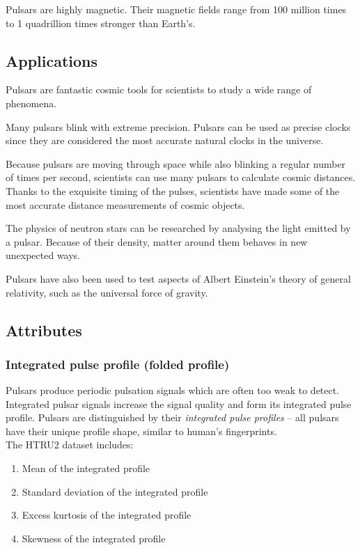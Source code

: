 \documentclass[a4paper,12pt]{article}
\begin{document}
    Pulsars are highly magnetic. Their magnetic fields range from 100 million times to 1 quadrillion times stronger than Earth's.\cite{pulsarWiki}

    \subsection{Applications}
    Pulsars are fantastic cosmic tools for scientists to study a wide range of phenomena.\par
    Many pulsars blink with extreme precision. Pulsars can be used as precise clocks since they are considered the most accurate natural clocks in the universe.\par
    Because pulsars are moving through space while also blinking a regular number of times per second, scientists can use many pulsars to calculate cosmic distances. Thanks to the exquisite timing of the pulses, scientists have made some of the most accurate distance measurements of cosmic objects.\par
    The physics of neutron stars can be researched by analysing the light emitted by a pulsar. Because of their density, matter around them behaves in new unexpected ways.\par
    Pulsars have also been used to test aspects of Albert Einstein's theory of general relativity, such as the universal force of gravity.\cite{pulsarSpace}
    \newpage

    \subsection{Attributes}
    \subsubsection{Integrated pulse profile (folded profile)}
    Pulsars produce periodic pulsation signals which are often too weak to detect. Integrated pulsar signals increase the signal quality and form its integrated pulse profile. Pulsars are distinguished by their \textit{integrated pulse profiles} – all pulsars have their unique profile shape, similar to human’s fingerprints. \cite{integratedProfile} \\
    The HTRU2 dataset includes:
    \begin{enumerate}
        \item Mean of the integrated profile
        \item Standard deviation of the integrated profile
        \item Excess kurtosis of the integrated profile
        \item Skewness of the integrated profile
    \end{enumerate}
\end{document}
